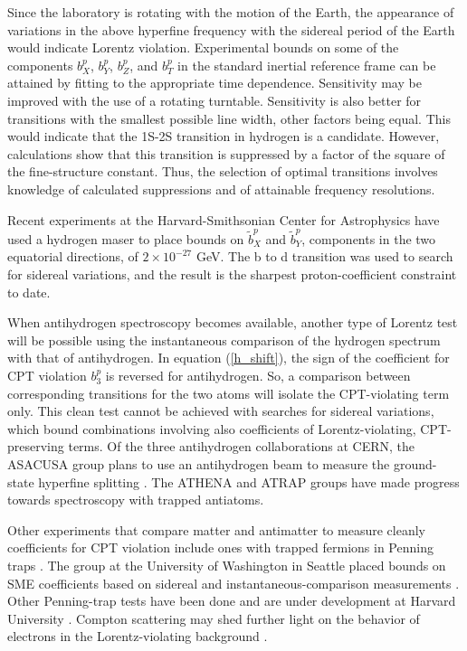 \documentclass[twocolumn]{revtex4}
\def\bt{\tilde b}
\newcommand{\rf}[1]{(\ref{#1})}
\begin{document}
Since the laboratory is rotating with the motion of the Earth,
the appearance of variations in the above hyperfine frequency
with the sidereal period of the Earth
would indicate Lorentz violation.
Experimental bounds on some of the components
$b_X^p$, $b_Y^p$, $b_Z^p$, and $b_T^p$
in the standard inertial reference frame
can be attained by fitting to the appropriate
time dependence.
Sensitivity may be improved with the use
of a rotating turntable.
Sensitivity is also better for transitions with the smallest possible
line width, other factors being equal.
This would indicate that the 1S-2S transition in hydrogen
is a candidate.
However,
calculations show that
this transition is suppressed by a factor
of the square of the fine-structure constant.
Thus, the selection of optimal transitions
involves knowledge of calculated suppressions
and of attainable frequency resolutions.

Recent experiments \cite{maser}
at the Harvard-Smithsonian Center for Astrophysics
have used a hydrogen maser
to place bounds on $\bt_X^p$ and $\bt_Y^p$,
components in the two equatorial directions,
of $2 \times 10^{-27}$ GeV.
The b to d transition was used to search for sidereal variations,
and the result is the sharpest proton-coefficient constraint to date.

When antihydrogen spectroscopy becomes available,
another type of Lorentz test will be possible
using the instantaneous comparison of the hydrogen
spectrum with that of antihydrogen.
In equation \rf{h_shift},
the sign of the coefficient for CPT violation
$b^p_3$ is reversed for antihydrogen.
So, a comparison between corresponding transitions
for the two atoms will isolate the CPT-violating term only.
This clean test cannot be achieved with searches
for sidereal variations,
which bound combinations involving also
coefficients of Lorentz-violating, CPT-preserving terms.
Of the three antihydrogen collaborations at CERN,
the ASACUSA group plans to use an antihydrogen beam to measure
the ground-state hyperfine splitting \cite{hayano}.
The ATHENA \cite{athena} and
ATRAP \cite{atrap} groups
have made progress towards spectroscopy with trapped antiatoms.

Other experiments that compare matter and antimatter
to measure cleanly
coefficients for CPT violation include ones with trapped fermions
in Penning traps \cite{penning}.
The group at the University of Washington in Seattle
placed bounds on SME coefficients based on sidereal
and instantaneous-comparison measurements \cite{penning_UW}.
Other Penning-trap tests have been done and are under development
at Harvard University \cite{penning_Harvard}.
Compton scattering may shed further light
on the behavior of electrons in the Lorentz-violating
background \cite{altschul}.
\end{document}
